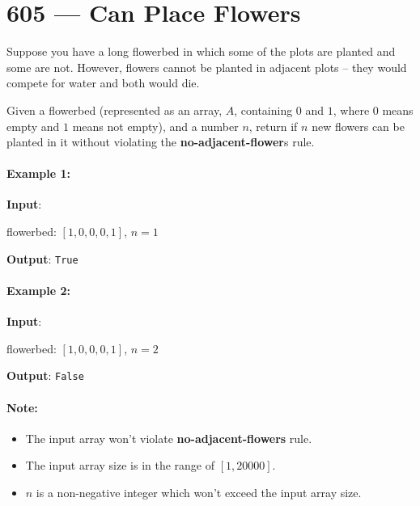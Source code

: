 \section{605 --- Can Place Flowers}
Suppose you have a long flowerbed in which some of the plots are planted and some are not. However, flowers cannot be planted in adjacent plots -- they would compete for water and both would die.

Given a flowerbed (represented as an array, $A$, containing $0$ and $1$, where $0$ means empty and $1$ means not empty), and a number $n$, return if $n$ new flowers can be planted in it without violating the \textbf{no-adjacent-flower}s rule.

\paragraph{Example 1:}

\begin{flushleft}

\textbf{Input}: 

flowerbed: $[1,0,0,0,1]$, $n = 1$

\textbf{Output}: \texttt{True}

\end{flushleft}

\paragraph{Example 2:}

\begin{flushleft}
\textbf{Input}: 

flowerbed: $[1,0,0,0,1]$, $n = 2$

\textbf{Output}: \texttt{False}

\end{flushleft}

\paragraph{Note:}

\begin{itemize}
\item The input array won't violate \textbf{no-adjacent-flowers} rule.
\item The input array size is in the range of $[1, 20000]$.
\item $n$ is a non-negative integer which won't exceed the input array size.
\end{itemize}

